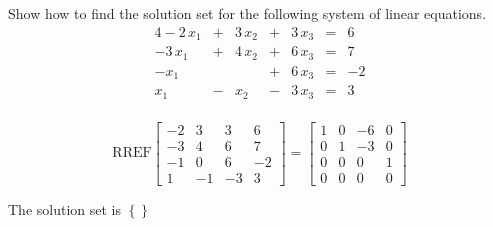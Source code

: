 
\begin{exerciseStatement}


Show how to find the solution set for the following system of linear equations. 
\begin{alignat*}{4} -2 \, x_{1} &+& 3 \, x_{2} &+& 3 \, x_{3} &=& 6 \\-3 \, x_{1} &+& 4 \, x_{2} &+& 6 \, x_{3} &=& 7 \\-x_{1} & &  &+& 6 \, x_{3} &=& -2 \\x_{1} &-& x_{2} &-& 3 \, x_{3} &=& 3 \\ \end{alignat*}
            


\end{exerciseStatement}
    
\begin{exerciseAnswer} 
\[\mathrm{RREF} \left[\begin{array}{ccc|c}
-2 & 3 & 3 & 6 \\
-3 & 4 & 6 & 7 \\
-1 & 0 & 6 & -2 \\
1 & -1 & -3 & 3
\end{array}\right]  =  \left[\begin{array}{ccc|c}
1 & 0 & -6 & 0 \\
0 & 1 & -3 & 0 \\
0 & 0 & 0 & 1 \\
0 & 0 & 0 & 0
\end{array}\right] \]

The solution set is \( \left\{\right\} \)


\end{exerciseAnswer}
    
